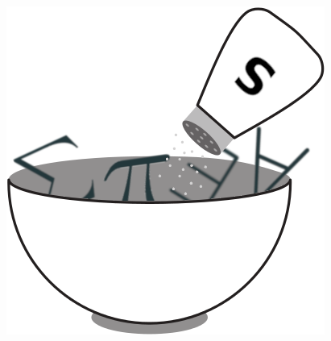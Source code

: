 \documentclass{beamer}
\begin{document}
\begin{frame}
\begin{figure}
    \includegraphics[height=0.8\textheight]{img/salt_shaker.png}
\end{figure}
\end{frame}
\end{document}
